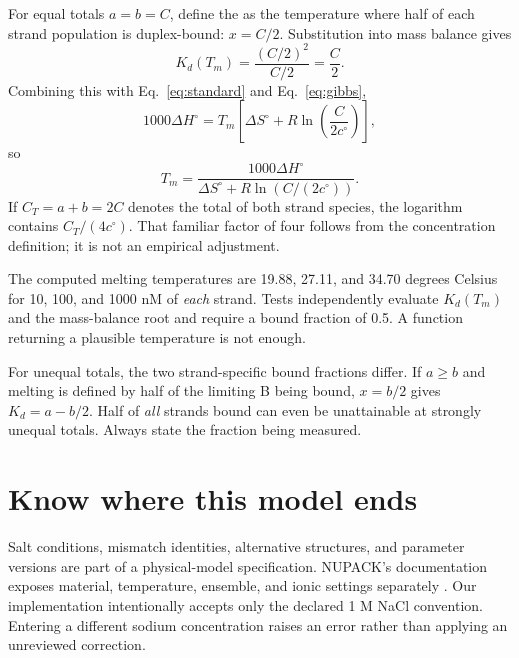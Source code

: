 For equal totals $a=b=C$, define the  as the
temperature where half of each strand population is duplex-bound:
$x=C/2$. Substitution into mass balance gives
\begin{equation}
K_d(T_m)=\frac{(C/2)^2}{C/2}=\frac C2.
\end{equation}
Combining this with Eq.~\ref{eq:standard} and Eq.~\ref{eq:gibbs},
\begin{equation}
1000\Delta H^\circ
=T_m\left[\Delta S^\circ+R\ln\left(\frac{C}{2c^\circ}\right)\right],
\end{equation}
so
\begin{equation}
T_m=
\frac{1000\Delta H^\circ}
{\Delta S^\circ+R\ln(C/(2c^\circ))}.
\label{eq:tm}
\end{equation}
If $C_T=a+b=2C$ denotes the total of both strand species, the logarithm
contains $C_T/(4c^\circ)$. That familiar factor of four follows from the
concentration definition; it is not an empirical adjustment.



The computed melting temperatures are 19.88, 27.11, and 34.70 degrees Celsius
for 10, 100, and 1000 nM of \emph{each} strand. Tests independently evaluate
$K_d(T_m)$ and the mass-balance root and require a bound fraction of 0.5.
A function returning a plausible temperature is not enough.

For unequal totals, the two strand-specific bound fractions differ.
If $a\geq b$ and melting is defined by half of the limiting B being bound,
$x=b/2$ gives $K_d=a-b/2$. Half of \emph{all} strands bound can even be
unattainable at strongly unequal totals. Always state the fraction being measured.

\section{Know where this model ends}

Salt conditions, mismatch identities, alternative structures, and parameter
versions are part of a physical-model specification. NUPACK's documentation
exposes material, temperature, ensemble, and ionic settings separately
\cite{nupack}. Our implementation intentionally accepts only the declared
1 M NaCl convention. Entering a different sodium concentration raises an
error rather than applying an unreviewed correction.

